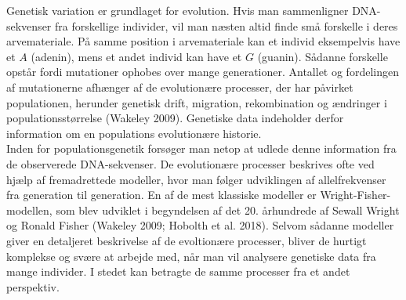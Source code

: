 \documentclass[
  10pt,
  a4paper,
]{scrbook}
\begin{document}
Genetisk variation er grundlaget for evolution. Hvis man sammenligner
DNA-sekvenser fra forskellige individer, vil man næsten altid finde små
forskelle i deres arvemateriale. På samme position i arvemateriale kan
et individ eksempelvis have et \(A\) (adenin), mens et andet individ kan
have et \(G\) (guanin). Sådanne forskelle opstår fordi mutationer
ophobes over mange generationer. Antallet og fordelingen af mutationerne
afhænger af de evolutionære processer, der har påvirket populationen,
herunder genetisk drift, migration, rekombination og ændringer i
populationsstørrelse (Wakeley 2009). Genetiske data indeholder derfor
information om en populations evolutionære historie.\\
Inden for populationsgenetik forsøger man netop at udlede denne
information fra de observerede DNA-sekvenser. De evolutionære processer
beskrives ofte ved hjælp af fremadrettede modeller, hvor man følger
udviklingen af allelfrekvenser fra generation til generation. En af de
mest klassiske modeller er Wright-Fisher-modellen, som blev udviklet i
begyndelsen af det 20. århundrede af Sewall Wright og Ronald Fisher
(Wakeley 2009; Hobolth et al. 2018). Selvom sådanne modeller giver en
detaljeret beskrivelse af de evoltionære processer, bliver de hurtigt
komplekse og svære at arbejde med, når man vil analysere genetiske data
fra mange individer. I stedet kan betragte de samme processer fra et
andet perspektiv.
\end{document}
